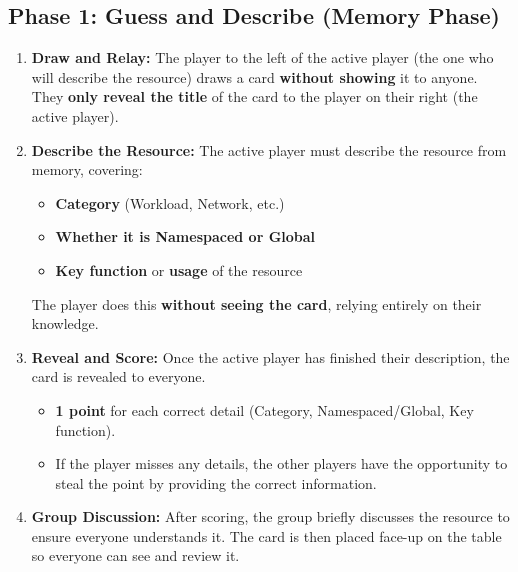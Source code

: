 \documentclass{article}
\begin{document}
\subsection*{Phase 1: Guess and Describe (Memory Phase)}
\begin{enumerate}[label=\arabic*.]
    \item \textbf{Draw and Relay:} The player to the left of the active player (the one who will describe the resource) draws a card \textbf{without showing} it to anyone. They \textbf{only reveal the title} of the card to the player on their right (the active player).
    
    \item \textbf{Describe the Resource:} The active player must describe the resource from memory, covering:
    \begin{itemize}
        \item \textbf{Category} (Workload, Network, etc.)
        \item \textbf{Whether it is Namespaced or Global}
        \item \textbf{Key function} or \textbf{usage} of the resource
    \end{itemize}
    The player does this \textbf{without seeing the card}, relying entirely on their knowledge.
    
    \item \textbf{Reveal and Score:} Once the active player has finished their description, the card is revealed to everyone.
    \begin{itemize}
        \item \textbf{1 point} for each correct detail (Category, Namespaced/Global, Key function).
        \item If the player misses any details, the other players have the opportunity to steal the point by providing the correct information.
    \end{itemize}
    
    \item \textbf{Group Discussion:} After scoring, the group briefly discusses the resource to ensure everyone understands it. The card is then placed face-up on the table so everyone can see and review it.
\end{enumerate}
\end{document}
